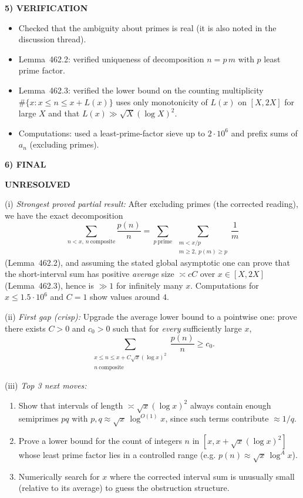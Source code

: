 \medskip
\noindent\textbf{5) VERIFICATION}

\begin{itemize}
\item Checked that the ambiguity about primes is real (it is also noted in the discussion thread).
\item Lemma~462.2: verified uniqueness of decomposition $n=p\,m$ with $p$ least prime factor.
\item Lemma~462.3: verified the lower bound on the counting multiplicity $\#\{x: x\le n\le x+L(x)\}$ uses only monotonicity of $L(x)$ on $[X,2X]$ for large $X$ and that $L(x)\gg \sqrt{X}(\log X)^2$.
\item Computations: used a least-prime-factor sieve up to $2\cdot 10^6$ and prefix sums of $a_n$ (excluding primes).
\end{itemize}

\noindent\textbf{6) FINAL}

\textbf{UNRESOLVED}

(i) \emph{Strongest proved partial result:} After excluding primes (the corrected reading), we have the exact decomposition
\[\sum_{n<x,\,n\ \mathrm{composite}}\frac{p(n)}{n}=\sum_{p\ \mathrm{prime}}\ \sum_{\substack{m<x/p\\ m\ge 2,\ p(m)\ge p}} \frac1m\]
(Lemma~462.2), and assuming the stated global asymptotic one can prove that the short-interval sum has positive \emph{average} size $\asymp cC$ over $x\in[X,2X]$ (Lemma~462.3), hence is $\gg 1$ for infinitely many $x$. Computations for $x\le 1.5\cdot 10^6$ and $C=1$ show values around $4$.

(ii) \emph{First gap (crisp):} Upgrade the average lower bound to a pointwise one: prove there exists $C>0$ and $c_0>0$ such that for \emph{every} sufficiently large $x$,
\[\sum_{\substack{x\le n\le x+C\sqrt{x}(\log x)^2\\ n\ \mathrm{composite}}}\frac{p(n)}{n}\ge c_0.
\]

(iii) \emph{Top 3 next moves:}
\begin{enumerate}
\item Show that intervals of length $\asymp \sqrt{x}(\log x)^2$ always contain enough semiprimes $pq$ with $p,q\approx \sqrt{x}\,\log^{O(1)}x$, since such terms contribute $\approx 1/q$.
\item Prove a lower bound for the count of integers $n$ in $[x,x+\sqrt{x}(\log x)^2]$ whose least prime factor lies in a controlled range (e.g. $p(n)\approx \sqrt{x}\,\log^A x$).
\item Numerically search for $x$ where the corrected interval sum is unusually small (relative to its average) to guess the obstruction structure.
\end{enumerate}

